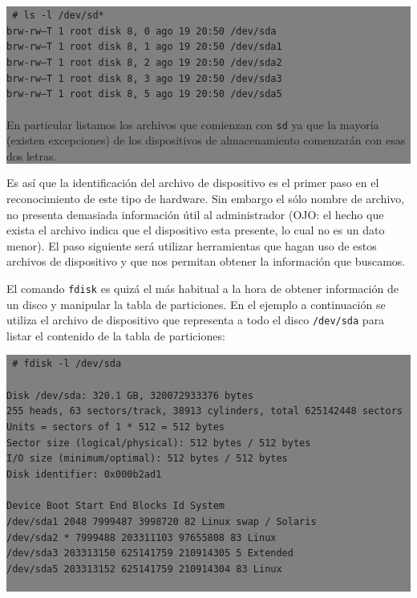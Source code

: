 \documentclass[12pt]{article}
\begin{document}
\colorbox{grey}{\parbox[t]{0.95\linewidth}{ \vspace*{0.5cm} { 
{\tt
\# ls -l /dev/sd*\\
brw-rw---T  1 root disk        8,   0 ago 19 20:50 /dev/sda\\
brw-rw---T  1 root disk        8,   1 ago 19 20:50 /dev/sda1\\
brw-rw---T  1 root disk        8,   2 ago 19 20:50 /dev/sda2\\
brw-rw---T  1 root disk        8,   3 ago 19 20:50 /dev/sda3\\
brw-rw---T  1 root disk        8,   5 ago 19 20:50 /dev/sda5\\
}
\\
En particular listamos los archivos que comienzan con \texttt{sd} ya que la 
mayoría (existen excepciones) de los dispositivos de almacenamiento comenzarán con esas 
dos letras. 
} \vspace*{0.5cm} } } 

Es así que la identificación del archivo de dispositivo es el primer paso en el 
reconocimiento de este tipo de hardware. Sin embargo el sólo nombre de archivo, no 
presenta demasiada información útil al administrador (OJO: el hecho que exista el 
archivo indica que el dispositivo esta presente, lo cual no es un dato menor). El paso 
siguiente será utilizar herramientas que hagan uso de estos archivos de dispositivo y que nos 
permitan obtener la información que buscamos. 

El comando \texttt{fdisk} es quizá el más habitual a la hora de obtener 
información de un disco y manipular la tabla de particiones. En el ejemplo 
a continuación se utiliza el archivo de dispositivo que representa a todo 
el disco \texttt{/dev/sda} para listar el contenido de la tabla de particiones:
 

\colorbox{grey}{\parbox[t]{0.95\linewidth}{ \vspace*{0.5cm} { 
{\tt
\# fdisk -l /dev/sda\\
\\
Disk /dev/sda: 320.1 GB, 320072933376 bytes\\
255 heads, 63 sectors/track, 38913 cylinders, total 625142448 sectors\\
Units = sectors of 1 * 512 = 512 bytes\\
Sector size (logical/physical): 512 bytes / 512 bytes\\
I/O size (minimum/optimal): 512 bytes / 512 bytes\\
Disk identifier: 0x000b2ad1\\
\\
   Device Boot      Start         End      Blocks   Id  System\\
/dev/sda1            2048     7999487     3998720   82  Linux swap / Solaris\\
/dev/sda2   *     7999488   203311103    97655808   83  Linux\\
/dev/sda3       203313150   625141759   210914305    5  Extended\\
/dev/sda5       203313152   625141759   210914304   83  Linux\\
\\
}
} \vspace*{0.5cm} } } 
\end{document}
